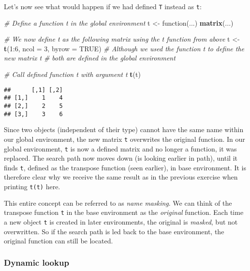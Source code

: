 \documentclass[11,]{article}
\newenvironment{Shaded}{\begin{snugshade}}{\end{snugshade}}
\newcommand{\KeywordTok}[1]{\textcolor[rgb]{0.13,0.29,0.53}{\textbf{{#1}}}}
\newcommand{\DataTypeTok}[1]{\textcolor[rgb]{0.13,0.29,0.53}{{#1}}}
\newcommand{\DecValTok}[1]{\textcolor[rgb]{0.00,0.00,0.81}{{#1}}}
\newcommand{\StringTok}[1]{\textcolor[rgb]{0.31,0.60,0.02}{{#1}}}
\newcommand{\CommentTok}[1]{\textcolor[rgb]{0.56,0.35,0.01}{\textit{{#1}}}}
\newcommand{\OtherTok}[1]{\textcolor[rgb]{0.56,0.35,0.01}{{#1}}}
\newcommand{\NormalTok}[1]{{#1}}
\begin{document}
Let's now see what would happen if we had defined \texttt{T} instead as
\texttt{t}:

\begin{Shaded}
\begin{Highlighting}[]
\CommentTok{# Define a function t in the global environment}
\NormalTok{t <-}\StringTok{ }\NormalTok{function(...) }\KeywordTok{matrix}\NormalTok{(...)}

\CommentTok{# We now define t as the following matrix using the t function from above}
\NormalTok{t <-}\StringTok{ }\KeywordTok{t}\NormalTok{(}\DecValTok{1}\NormalTok{:}\DecValTok{6}\NormalTok{, }\DataTypeTok{ncol =} \DecValTok{3}\NormalTok{, }\DataTypeTok{byrow =} \OtherTok{TRUE}\NormalTok{)}
\CommentTok{# Although we used the function t to define the new matrix t}
\CommentTok{# both are defined in the global environment}

\CommentTok{# Call defined function t with argument t}
\KeywordTok{t}\NormalTok{(t)}
\end{Highlighting}
\end{Shaded}

\begin{verbatim}
##      [,1] [,2]
## [1,]    1    4
## [2,]    2    5
## [3,]    3    6
\end{verbatim}

Since two objects (independent of their type) cannot have the same name
within our global environment, the new matrix \texttt{t} overwrites the
original function. In our global environment, \texttt{t} is now a
defined matrix and no longer a function, it was replaced. The search
path now moves down (is looking earlier in path), until it finds
\texttt{t}, defined as the transpose function (seen earlier), in base
environment. It is therefore clear why we receive the same result as in
the previous exercise when printing \texttt{t(t)} here.

This entire concept can be referred to as \emph{name masking}. We can
think of the transpose function \texttt{t} in the base environment as
the \emph{original} function. Each time a new object \texttt{t} is
created in later environments, the original is \emph{masked}, but not
overwritten. So if the search path is led back to the base environment,
the original function can still be located.

\subsubsection{Dynamic lookup}\label{dynamic-lookup}
\end{document}
